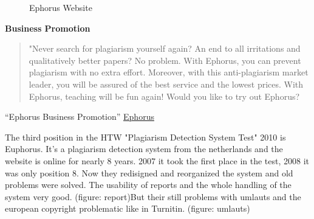  \begin{figure}[!h]
  \centering
  \caption{Ephorus Website}
  \label{fig:plagawareWebsite}
\end{figure}

\textbf{Business Promotion}
\begin{quote}
"Never search for plagiarism yourself again? An end to all irritations and qualitatively better papers? No problem. With Ephorus, you can prevent plagiarism with no extra effort. Moreover, with this anti-plagiarism market leader, you will be assured of the best service and the lowest prices. With Ephorus, teaching will be fun again! Would you like to try out Ephorus?
\end{quote}
\enquote{Ephorus Business Promotion}\citep{Euphorus Website} \href{http://www.ephorus.com}{Ephorus}


The third position in the HTW "Plagiarism Detection System Test" 2010 is Euphorus. It's a plagiarism detection system from the netherlands and the website is online for nearly 8 years.
2007 it took the first place in the test, 2008 it was only position 8. Now they redisigned and reorganized the system and old problems were solved. The usability of reports and the whole handling of the system very good. (figure: report)But their still problems with umlauts and the european copyright problematic like in Turnitin. (figure: umlauts)



